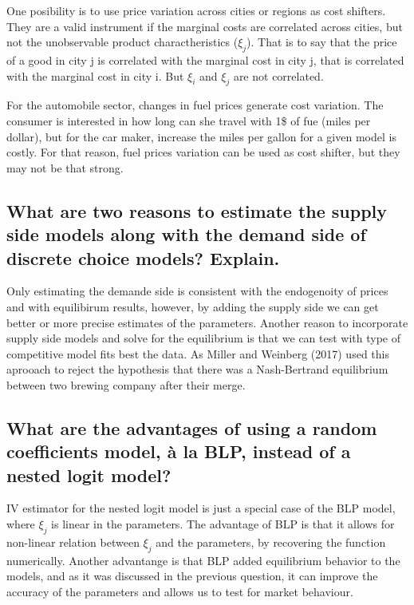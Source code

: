 \documentclass[]{article}
\begin{document}
One posibility is to use price variation across cities or regions as
cost shifters. They are a valid instrument if the marginal costs are
correlated across cities, but not the unobservable product
charactheristics (\(\xi_j\)). That is to say that the price of a good in
city j is correlated with the marginal cost in city j, that is
correlated with the marginal cost in city i. But \(\xi_i\) and \(\xi_j\)
are not correlated.

For the automobile sector, changes in fuel prices generate cost
variation. The consumer is interested in how long can she travel with
1\$ of fue (miles per dollar), but for the car maker, increase the miles
per gallon for a given model is costly. For that reason, fuel prices
variation can be used as cost shifter, but they may not be that strong.

\hypertarget{sec:question5}{%
\subsection{What are two reasons to estimate the supply side models
along with the demand side of discrete choice models?
Explain.}\label{sec:question5}}

Only estimating the demande side is consistent with the endogenoity of
prices and with equilibirum results, however, by adding the supply side
we can get better or more precise estimates of the parameters. Another
reason to incorporate supply side models and solve for the equilibrium
is that we can test with type of competitive model fits best the data.
As Miller and Weinberg (2017) used this aprooach to reject the
hypothesis that there was a Nash-Bertrand equilibrium between two
brewing company after their merge.

\hypertarget{what-are-the-advantages-of-using-a-random-coefficients-model-a-la-blp-instead-of-a-nested-logit-model}{%
\subsection{What are the advantages of using a random coefficients
model, à la BLP, instead of a nested logit
model?}\label{what-are-the-advantages-of-using-a-random-coefficients-model-a-la-blp-instead-of-a-nested-logit-model}}

IV estimator for the nested logit model is just a special case of the
BLP model, where \(\xi_j\) is linear in the parameters. The advantage of
BLP is that it allows for non-linear relation between \(\xi_j\) and the
parameters, by recovering the function numerically. Another advantange
is that BLP added equilibrium behavior to the models, and as it was
discussed in the previous question, it can improve the accuracy of the
parameters and allows us to test for market behaviour.
\end{document}
